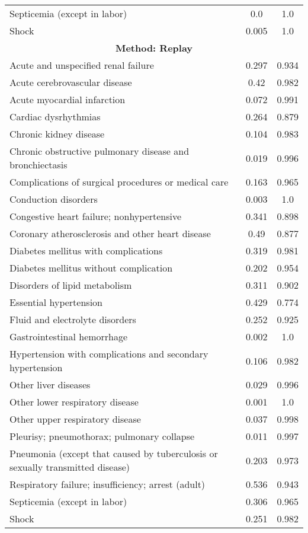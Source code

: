\documentclass{article}
\begin{document}
\begin{longtable}{lcc}
Septicemia (except in labor) & 0.0 & 1.0 \\
Shock & 0.005 & 1.0 \\
\midrule
\multicolumn{3}{c}{\textbf{Method: Replay}} \\
\midrule
Acute and unspecified renal failure & 0.297 & 0.934 \\
Acute cerebrovascular disease & 0.42 & 0.982 \\
Acute myocardial infarction & 0.072 & 0.991 \\
Cardiac dysrhythmias & 0.264 & 0.879 \\
Chronic kidney disease & 0.104 & 0.983 \\
Chronic obstructive pulmonary disease and bronchiectasis & 0.019 & 0.996 \\
Complications of surgical procedures or medical care & 0.163 & 0.965 \\
Conduction disorders & 0.003 & 1.0 \\
Congestive heart failure; nonhypertensive & 0.341 & 0.898 \\
Coronary atherosclerosis and other heart disease & 0.49 & 0.877 \\
Diabetes mellitus with complications & 0.319 & 0.981 \\
Diabetes mellitus without complication & 0.202 & 0.954 \\
Disorders of lipid metabolism & 0.311 & 0.902 \\
Essential hypertension & 0.429 & 0.774 \\
Fluid and electrolyte disorders & 0.252 & 0.925 \\
Gastrointestinal hemorrhage & 0.002 & 1.0 \\
Hypertension with complications and secondary hypertension & 0.106 & 0.982 \\
Other liver diseases & 0.029 & 0.996 \\
Other lower respiratory disease & 0.001 & 1.0 \\
Other upper respiratory disease & 0.037 & 0.998 \\
Pleurisy; pneumothorax; pulmonary collapse & 0.011 & 0.997 \\
Pneumonia (except that caused by tuberculosis or sexually transmitted disease) & 0.203 & 0.973 \\
Respiratory failure; insufficiency; arrest (adult) & 0.536 & 0.943 \\
Septicemia (except in labor) & 0.306 & 0.965 \\
Shock & 0.251 & 0.982 \\

\end{longtable}
\end{document}
